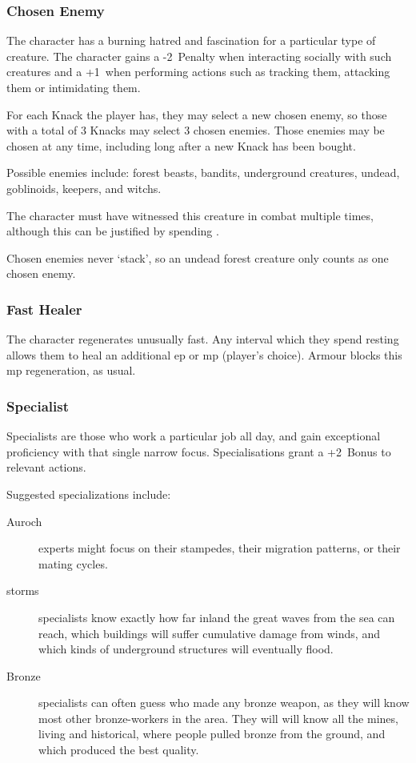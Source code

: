 \begin{multicols}{2}

\subsubsection{Chosen Enemy}

The character has a burning hatred and fascination for a particular type of creature.
The character gains a -2~Penalty when interacting socially with such creatures and a +1~when performing actions such as tracking them, attacking them or intimidating them.

For each Knack the player has, they may select a new chosen enemy, so those with a total of 3 Knacks may select 3 chosen enemies. Those enemies may be chosen at any time, including long after a new Knack has been bought.

Possible enemies include: forest beasts, bandits, underground creatures, undead, goblinoids, \glspl{keeper}, and \glspl{witch}.

The character must have witnessed this creature in combat multiple times, although this can be justified by spending .%

Chosen enemies never `stack', so an undead forest creature only counts as one chosen enemy.

\subsubsection{Fast Healer}

The character regenerates unusually fast.
Any \gls{interval} which they spend resting allows them to heal an additional \gls{ep} or \gls{mp} (player's choice).
Armour blocks this \gls{mp} regeneration, as usual.

\subsubsection{Specialist}
\label{specialist}

Specialists are those who work a particular job all day, and gain exceptional proficiency with that single narrow focus.
Specialisations grant a +2~Bonus to relevant actions.

Suggested specializations include:

\begin{description}
  \item[Auroch]
  experts might focus on their stampedes, their migration patterns, or their mating cycles.
  \item[\Glspl{storm}]
  specialists know exactly how far inland the great waves from the sea can reach, which buildings will suffer cumulative damage from winds, and which kinds of underground structures will eventually flood.
  \item[Bronze]
  specialists can often guess who made any bronze weapon, as they will know most other bronze-workers in the area.
  They will will know all the mines, living and historical, where people pulled bronze from the ground, and which produced the best quality.
\end{description}


\end{multicols}
